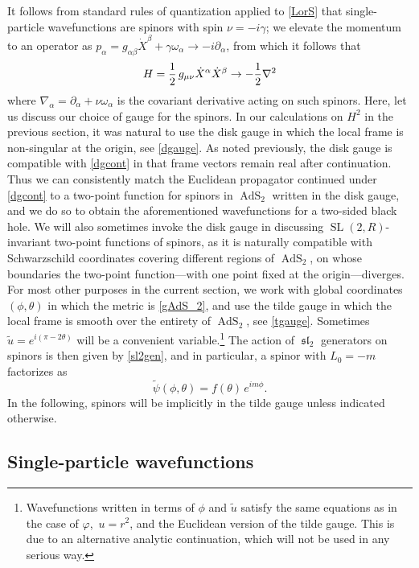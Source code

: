 \documentclass[11pt]{article}
\newcommand{\be}{\begin{equation}}
\newcommand{\ee}{\end{equation}}
\newcommand{\vp}{\varphi}
\newcommand{\RR}{\mathbb{R}}
\DeclareMathOperator{\sL}{\mathfrak{sl}}
\DeclareMathOperator{\tSL}{\widetilde{\mathrm{SL}}}
\DeclareMathOperator{\tAdS}{\widetilde{AdS}}
\DeclareMathOperator{\HH}{H}
\newcommand{\tpsi}{\tilde{\psi}}
\newcommand{\al}{\alpha}
\newcommand{\bt}{\beta}
\newcommand{\tht}{\theta}
\newcommand{\om}{\omega}
\newcommand{\ga}{\gamma}
\newcommand{\ov}{\over}
\newcommand{\p}{\partial}
\def\widetilde#1{#1}%
\def\HH{H}
\def\RR{R}
\begin{document}
It follows from standard rules of quantization applied to \eqref{LorS} that single-particle wavefunctions are spinors with spin $\nu=-i \ga$; we elevate the momentum to an operator as $p_{\al} =g_{\al\bt}\dot{X}^{\bt}+\ga \om_{\al} \to -i \p_{\al}$, from which it follows that 
\be \label{Ham}
H={1 \ov 2}\,g_{\mu\nu}\dot{X}^{\al}\dot{X}^{\bt} \to -{1 \ov 2}\nabla^2
\ee
where $\nabla_{\al}=\partial_{\al}+\nu\omega_{\al}$ is the covariant derivative acting on such spinors. Here, let us discuss our choice of gauge for the spinors. In our calculations on $\HH^2$ in the previous section, it was natural to use the disk gauge in which the local frame is non-singular at the origin, see \eqref{dgauge}. As noted previously, the disk gauge is compatible with \eqref{dgcont} in that frame vectors remain real after continuation. Thus we can consistently match the Euclidean propagator continued under \eqref{dgcont} to a two-point function for spinors in $\tAdS_2$ written in the disk gauge, and we do so to obtain the aforementioned wavefunctions for a two-sided black hole. We will also sometimes invoke the disk gauge in discussing $\tSL(2,\RR)$-invariant two-point functions of spinors, as it is naturally compatible with Schwarzschild coordinates covering different regions of $\tAdS_2$, on whose boundaries the two-point function---with one point fixed at the origin---diverges. For most other purposes in the current section, we work with global coordinates $(\phi,\theta)$ in which the metric is \eqref{gAdS_2}, and use the tilde gauge in which the local frame is smooth over the entirety of $\tAdS_2$, see \eqref{tgauge}. Sometimes $\tilde{u}=e^{i(\pi-2 \tht)}$ will be a convenient variable.\footnote{Wavefunctions written in terms of $\phi$ and $\tilde{u}$ satisfy the same equations as in the case of $\vp$,\, $u=r^2$, and the Euclidean version of the tilde gauge. This is due to an alternative analytic continuation, which will not be used in any serious way.} The action of $\sL_2$ generators on spinors is then given by \eqref{sl2gen}, and in particular, a spinor with $L_0=-m$ factorizes as
\be \label{tpsifact}
\tpsi(\phi, \tht)=f(\tht)\,e^{im\phi}.
\ee
In the following, spinors will be implicitly in the tilde gauge unless indicated otherwise.

\subsection{Single-particle wavefunctions} \label{sec:partwf}
\end{document}
